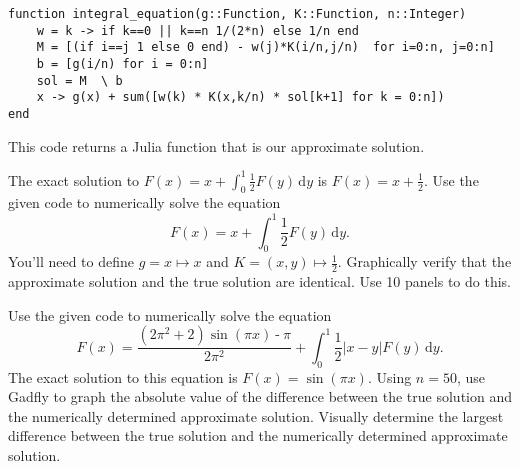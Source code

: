 \documentclass[12pt,fleqn]{exam}
\begin{document}
\begin{verbatim}
function integral_equation(g::Function, K::Function, n::Integer)
    w = k -> if k==0 || k==n 1/(2*n) else 1/n end
    M = [(if i==j 1 else 0 end) - w(j)*K(i/n,j/n)  for i=0:n, j=0:n]
    b = [g(i/n) for i = 0:n]
    sol = M  \ b
    x -> g(x) + sum([w(k) * K(x,k/n) * sol[k+1] for k = 0:n])
end
\end{verbatim}
This code returns a Julia function that is our approximate solution.

\begin{questions}

\question [10] The exact solution to $F(x) = x + \int_0^1 \frac{1}{2} F(y) \, \mathrm{d} y$ is $F(x) = x + \frac{1}{2}$.   Use the 
given code to numerically solve the equation
\begin{equation}
F(x) = x + \int_0^1 \frac{1}{2} F(y) \, \mathrm{d} y.
\end{equation}
You'll need to define $g = x \mapsto x$ and $K = (x,y) \mapsto \frac{1}{2}$. Graphically verify that the approximate solution and
the true solution are identical. Use 10 panels to do this.


\question[10]  Use the given code to numerically solve the equation
\begin{equation}
F(x) =  \frac{\left( 2 {{\ensuremath{\pi} }^{2}}\operatorname{+}2\right)  \sin{\left( \ensuremath{\pi}  x\right) }\operatorname{-}\ensuremath{\pi} }{2 {{\ensuremath{\pi} }^{2}}}  + \int_0^1 \frac{1}{2} |x - y| F(y) \, \mathrm{d} y.
\end{equation}
The exact solution to this equation is $F(x) = \sin(\pi x)$.  Using $n=50$,  use Gadfly to graph the absolute value of the difference between
the true solution and the numerically determined approximate solution.  Visually determine the largest difference between the 
 true solution and the numerically determined approximate solution.
 

\end{questions}
\end{document}
